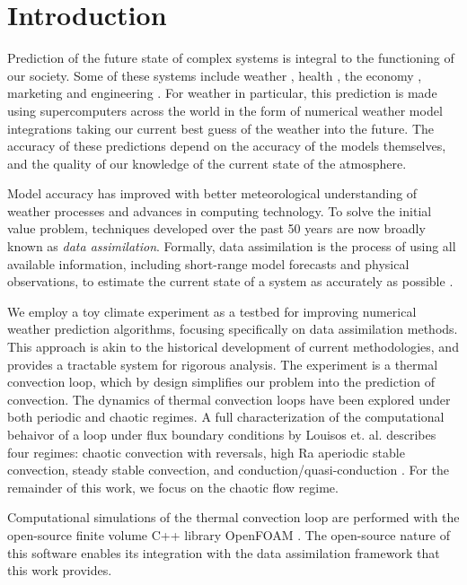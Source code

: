 \section{Introduction}

Prediction of the future state of complex systems is integral to the functioning of our society.
Some of these systems include weather \cite{weather-violence2013}, health \cite{ginsberg2008detecting}, the economy \cite{sornette2006predictability}, marketing \cite{asur2010predicting} and engineering \cite{savely1972}.
For weather in particular, this prediction is made using supercomputers across the world in the form of numerical weather model integrations taking our current best guess of the weather into the future.
The accuracy of these predictions depend on the accuracy of the models themselves, and the quality of our knowledge of the current state of the atmosphere.

Model accuracy has improved with better meteorological understanding of weather processes and advances in computing technology.
To solve the initial value problem, techniques developed over the past 50 years are now broadly known as {\em data assimilation}.
Formally, data assimilation is the process of using all available information, including short-range model forecasts and physical observations, to estimate the current state of a system as accurately as possible \cite{yang2006}.

We employ a toy climate experiment as a testbed for improving numerical weather prediction algorithms, focusing specifically on data assimilation methods.
This approach is akin to the historical development of current methodologies, and provides a tractable system for rigorous analysis.
The experiment is a thermal convection loop, which by design simplifies our problem into the prediction of convection.
The dynamics of thermal convection loops have been explored under both periodic \cite{keller1966} and chaotic \cite{welander1967,creveling1975stability,gorman1984,gorman1986,ehrhard1990dynamical,yuen1999,jiang2003,burroughs2005reduced,desrayaud2006numerical,yang2006,ridouane2010} regimes.
A full characterization of the computational behaivor of a loop under flux boundary conditions by Louisos et. al. describes four regimes: chaotic convection with reversals, high Ra aperiodic stable convection, steady stable convection, and conduction/quasi-conduction \cite{louisos2013}.
For the remainder of this work, we focus on the chaotic flow regime.

Computational simulations of the thermal convection loop are performed with the open-source finite volume C++ library OpenFOAM \cite{jasak2007}.
The open-source nature of this software enables its integration with the data assimilation framework that this work provides.

